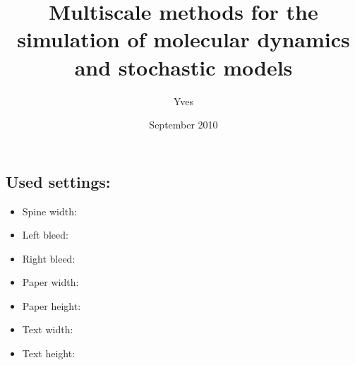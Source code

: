 \documentclass[cam,cover]{adsphd}
\title{Multiscale methods for the simulation of
  molecular dynamics and stochastic models}
\author{Yves}{Frederix}
\date{September 2010}
\begin{document}
\makefullcoverpage{\adsphdspinewidth}{}

\newlength{\testje}
\setlength{\testje}{10mm}

\mbox{}
\newpage
\subsection*{Used settings:}
\begin{itemize}
	\item Spine width: \printlength{\adsphdspinewidth}
	\item Left bleed: \printlength{\lbleed}
	\item Right bleed: \printlength{\rbleed}
	\item Paper width: \printlength{\adsphdpaperwidth}
	\item Paper height: \printlength{\adsphdpaperheight}
	\item Text width: \printlength{\textwidth}
	\item Text height: \printlength{\textheight}
\end{itemize}
\end{document}
